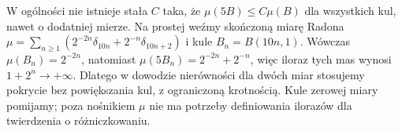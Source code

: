 \begin{uwaga}
W ogólności nie istnieje stała $C$ taka, że
$\mu(5B)\le C\mu(B)$ dla wszystkich kul, nawet o dodatniej
mierze. Na prostej weźmy skończoną miarę Radona
$\mu=\sum_{n\ge1}(2^{-2n}\delta_{10n}+2^{-n}\delta_{10n+2})$
i kule $B_n=B(10n,1)$. Wówczas
$\mu(B_n)=2^{-2n}$, natomiast
$\mu(5B_n)=2^{-2n}+2^{-n}$, więc iloraz tych mas wynosi
$1+2^n\to+\infty$.
Dlatego w dowodzie nierówności dla dwóch miar
stosujemy pokrycie bez powiększania kul, z ograniczoną
krotnością. Kule zerowej miary pomijamy; poza nośnikiem
$\mu$ nie ma potrzeby definiowania ilorazów dla twierdzenia
o różniczkowaniu.
\end{uwaga}

